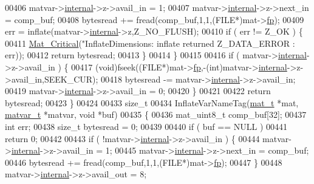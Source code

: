 \begin{DoxyCode}
{{{{{{{{{{{00406         matvar->\hyperlink{group___m_a_t_a6e97e3ed9f40c49322c18561c2a94e92}{internal}->z->avail\_in = 1;
00407         matvar->\hyperlink{group___m_a_t_a6e97e3ed9f40c49322c18561c2a94e92}{internal}->z->next\_in = comp\_buf;
00408         bytesread += fread(comp\_buf,1,1,(FILE*)mat->\hyperlink{struct__mat__t_a85f562e407ca9ad4d2a6e14f839432b7}{fp});
00409         err = inflate(matvar->\hyperlink{group___m_a_t_a6e97e3ed9f40c49322c18561c2a94e92}{internal}->z,Z\_NO\_FLUSH);
00410         \textcolor{keywordflow}{if} ( err != Z\_OK ) \{
00411             \hyperlink{group__mat__util_gaf51f2bfbb5580f575e4dd79757e2b80c}{Mat\_Critical}(\textcolor{stringliteral}{"InflateDimensions: inflate returned %
      Z\_DATA\_ERROR : err));
00412             \textcolor{keywordflow}{return} bytesread;
00413         \}
00414     \}
00415 
00416     \textcolor{keywordflow}{if} ( matvar->\hyperlink{group___m_a_t_a6e97e3ed9f40c49322c18561c2a94e92}{internal}->z->avail\_in ) \{
00417         (void)fseek((FILE*)mat->\hyperlink{struct__mat__t_a85f562e407ca9ad4d2a6e14f839432b7}{fp},-(int)matvar->\hyperlink{group___m_a_t_a6e97e3ed9f40c49322c18561c2a94e92}{internal}->z->avail\_in,SEEK\_CUR);
00418         bytesread -= matvar->\hyperlink{group___m_a_t_a6e97e3ed9f40c49322c18561c2a94e92}{internal}->z->avail\_in;
00419         matvar->\hyperlink{group___m_a_t_a6e97e3ed9f40c49322c18561c2a94e92}{internal}->z->avail\_in = 0;
00420     \}
00421 
00422     \textcolor{keywordflow}{return} bytesread;
00423 \}
00424 
00433 \textcolor{keywordtype}{size\_t}
00434 InflateVarNameTag(\hyperlink{struct__mat__t}{mat\_t} *mat, \hyperlink{group___m_a_t_structmatvar__t}{matvar\_t} *matvar, \textcolor{keywordtype}{void} *buf)
00435 \{
00436     mat\_uint8\_t comp\_buf[32];
00437     \textcolor{keywordtype}{int}    err;
00438     \textcolor{keywordtype}{size\_t} bytesread = 0;
00439 
00440     \textcolor{keywordflow}{if} ( buf == NULL )
00441         \textcolor{keywordflow}{return} 0;
00442 
00443     \textcolor{keywordflow}{if} ( !matvar->\hyperlink{group___m_a_t_a6e97e3ed9f40c49322c18561c2a94e92}{internal}->z->avail\_in ) \{
00444         matvar->\hyperlink{group___m_a_t_a6e97e3ed9f40c49322c18561c2a94e92}{internal}->z->avail\_in = 1;
00445         matvar->\hyperlink{group___m_a_t_a6e97e3ed9f40c49322c18561c2a94e92}{internal}->z->next\_in = comp\_buf;
00446         bytesread += fread(comp\_buf,1,1,(FILE*)mat->\hyperlink{struct__mat__t_a85f562e407ca9ad4d2a6e14f839432b7}{fp});
00447     \}
00448     matvar->\hyperlink{group___m_a_t_a6e97e3ed9f40c49322c18561c2a94e92}{internal}->z->avail\_out = 8;
}}}}}}}}}}}}
\end{DoxyCode}

